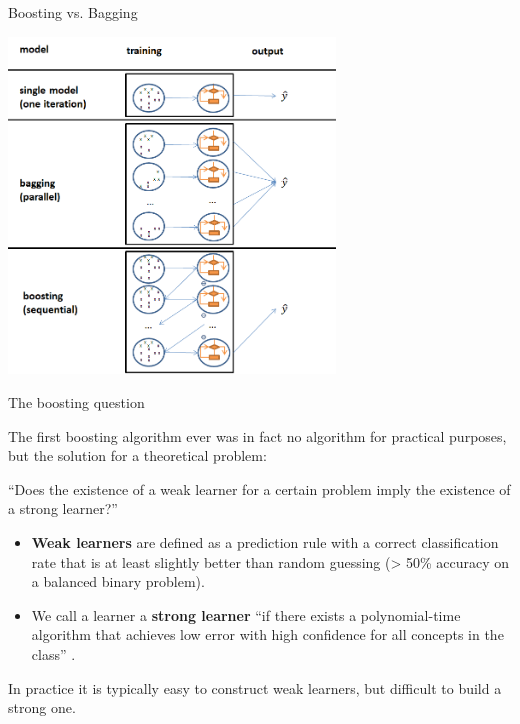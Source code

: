 \documentclass[11pt,compress,t,notes=noshow, xcolor=table]{beamer}
\begin{document}
\begin{vbframe}{Boosting vs. Bagging}

\begin{center}
\includegraphics[width=0.65\textwidth]{figure_man/bagging_vs_boosting.png}
\end{center}


\end{vbframe}

\begin{vbframe}{The boosting question}

The first boosting algorithm ever was in fact no algorithm for practical purposes, but the solution for a theoretical problem:

\lz

\enquote{Does the existence of a weak learner for a certain problem imply
the existence of a strong learner?} 

\lz

\begin{itemize}
\item \textbf{Weak learners} are defined as a prediction rule with a correct classification rate that is at least slightly better than random guessing (> 50\% accuracy on a balanced binary problem).
\item We call a learner a \textbf{strong learner} \enquote{if there exists a polynomial-time algorithm that achieves low error with high confidence for all concepts in the class} .

\end{itemize}

In practice it is typically easy to construct weak learners, but difficult to build a strong one.

\end{vbframe}
\end{document}

